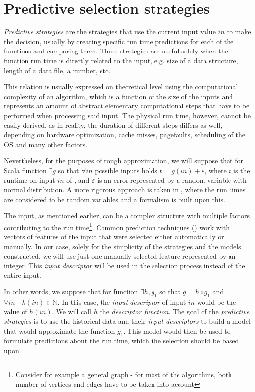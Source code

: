 \section{Predictive selection strategies}
\label{sec:predictive_strategies}

\textit{Predictive strategies} are the strategies that use the current input value $in$ to make the decision, usually by creating specific run time predictions for each of the functions and comparing them. These strategies are useful solely when the function run time is directly related to the input, e.g. size of a data structure, length of a data file, a number, etc. 

This relation is usually expressed on theoretical level using the computational complexity of an algorithm, which is a function of the size of the inputs and represents an amount of abstract elementary computational steps that have to be performed when processing said input. The physical run time, however, cannot be easily derived, as in reality, the duration of different steps differs as well, depending on hardware optimization, cache misses, pagefaults, scheduling of the OS and many other factors.

Nevertheless, for the purposes of rough approximation, we will suppose that for Scala function  \(\exists g\) so that \(\forall in\) possible inputs holds \(t = g(in) + \varepsilon\), where \(t\) is the runtime on input \(in\) of , and $\varepsilon$ is an error represented by a random variable with normal distribution. A more rigorous approach is taken in \cite{bulej_capturing_2012}, where the run times are considered to be random variables and a formalism is built upon this.

The input, as mentioned earlier, can be a complex structure with multiple factors contributing to the run time\footnote{Consider for example a general graph - for most of the algorithms, both number of vertices and edges have to be taken into account}. Common prediction techniques (\cite{chun_mantis:_2010,goldsmith_measuring_2007}) work with vectors of features of the input that were selected either automatically or manually. In our case, solely for the simplicity of the strategies and the models constructed, we will use just one manually selected feature represented by an integer. This \textit{input descriptor} will be used in the selection process instead of the entire input.

In other words, we suppose that for function  \(\exists h, g_1\) so that
\(g = h \circ g_1\) 
and 
\(\forall in \quad h(in) \in \mathbb{N}\). In this case, the \textit{input descriptor} of input \(in\) would be the value of \(h(in)\). We will call $h$ the \textit{descriptor function}. The goal of the \textit{predictive strategies} is to use the historical data and their \textit{input descriptors} to build a model that would approximate the function $g_1$. This model would then be used to formulate predictions about the run time, which the selection should be based upon.

